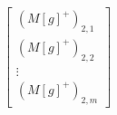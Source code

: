 \documentclass[preview]{standalone}
\begin{document}
\begin{align*}
\begin{bmatrix} (M[g]^+)_{2, 1} \\ (M[g]^+)_{2, 2} \\ \vdots \\ (M[g]^+)_{2, m} \end{bmatrix}
\end{align*}
\end{document}
